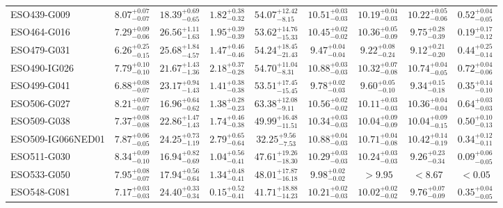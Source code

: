 \documentclass[onecolumn]{mn2e}
\begin{document}
{\begin{center}
\begin{longtable}{lcccccccc}
ESO439-G009 & $8.07_{-0.07}^{+0.07}$ & $18.39_{-0.65}^{+0.69}$ & $1.82_{-0.32}^{+0.38}$ &$54.07_{-8.15}^{+12.42}$ & $10.51_{-0.03}^{+0.03}$ & $10.19_{-0.03}^{+0.04}$ & $10.22_{-0.06}^{+0.05}$ & $0.52_{-0.05}^{+0.04}$ \\
ESO464-G016 & $7.29_{-0.06}^{+0.09}$ & $26.56_{-1.63}^{+1.11}$ & $1.95_{-0.39}^{+0.39}$ &$53.62_{-15.33}^{+14.76}$ & $10.45_{-0.02}^{+0.02}$ & $10.36_{-0.09}^{+0.05}$ & $9.75_{-0.39}^{+0.28}$ & $0.19_{-0.12}^{+0.17}$ \\
ESO479-G031 & $6.26_{-0.15}^{+0.25}$ & $25.68_{-4.57}^{+1.84}$ & $1.47_{-0.46}^{+0.46}$ &$54.24_{-21.43}^{+18.45}$ & $9.47_{-0.04}^{+0.04}$ & $9.22_{-0.24}^{+0.08}$ & $9.12_{-0.20}^{+0.21}$ & $0.44_{-0.14}^{+0.25}$ \\
ESO490-IG026 & $7.79_{-0.10}^{+0.10}$ & $21.67_{-1.36}^{+1.43}$ & $2.18_{-0.28}^{+0.37}$ &$54.70_{-8.31}^{+11.04}$ & $10.88_{-0.03}^{+0.03}$ & $10.32_{-0.08}^{+0.07}$ & $10.74_{-0.05}^{+0.04}$ & $0.72_{-0.06}^{+0.04}$ \\
ESO499-G041 & $6.88_{-0.07}^{+0.08}$ & $23.17_{-1.43}^{+0.94}$ & $1.41_{-0.38}^{+0.38}$ &$53.51_{-15.45}^{+17.45}$ & $9.78_{-0.03}^{+0.02}$ & $9.60_{-0.10}^{+0.05}$ & $9.34_{-0.18}^{+0.15}$ & $0.35_{-0.10}^{+0.14}$ \\
ESO506-G027 & $8.21_{-0.07}^{+0.07}$ & $16.96_{-0.62}^{+0.64}$ & $1.38_{-0.23}^{+0.28}$ &$63.38_{-9.11}^{+12.08}$ & $10.56_{-0.02}^{+0.02}$ & $10.11_{-0.03}^{+0.03}$ & $10.36_{-0.04}^{+0.04}$ & $0.64_{-0.03}^{+0.03}$ \\
ESO509-G038 & $7.37_{-0.08}^{+0.08}$ & $22.86_{-1.43}^{+1.47}$ & $1.74_{-0.38}^{+0.46}$ &$49.99_{-11.51}^{+16.48}$ & $10.34_{-0.03}^{+0.03}$ & $10.04_{-0.09}^{+0.09}$ & $10.04_{-0.15}^{+0.09}$ & $0.50_{-0.13}^{+0.10}$ \\
ESO509-IG066NED01 & $7.87_{-0.05}^{+0.06}$ & $24.25_{-1.19}^{+0.73}$ & $2.79_{-0.64}^{+0.65}$ &$32.25_{-7.53}^{+9.56}$ & $10.88_{-0.03}^{+0.04}$ & $10.71_{-0.08}^{+0.04}$ & $10.42_{-0.19}^{+0.14}$ & $0.34_{-0.11}^{+0.12}$ \\
ESO511-G030 & $8.34_{-0.10}^{+0.09}$ & $16.94_{-0.69}^{+0.82}$ & $1.04_{-0.41}^{+0.56}$ &$47.61_{-18.30}^{+19.26}$ & $10.29_{-0.03}^{+0.03}$ & $10.24_{-0.03}^{+0.03}$ & $9.26_{-0.34}^{+0.23}$ & $0.09_{-0.05}^{+0.06}$ \\
ESO533-G050 & $7.95_{-0.07}^{+0.08}$ & $17.94_{-0.64}^{+0.56}$ & $1.34_{-0.41}^{+0.48}$ &$48.01_{-16.18}^{+17.87}$ & $9.98_{-0.02}^{+0.02}$ & $>9.95$ & $<8.67$ & $<0.05$ \\
ESO548-G081 & $7.17_{-0.03}^{+0.03}$ & $24.40_{-0.34}^{+0.33}$ & $0.15_{-0.41}^{+0.52}$ &$41.71_{-14.23}^{+18.88}$ & $10.21_{-0.03}^{+0.02}$ & $10.02_{-0.02}^{+0.02}$ & $9.76_{-0.09}^{+0.07}$ & $0.35_{-0.05}^{+0.04}$ \\

\end{longtable}
\end{center}}
\end{document}
